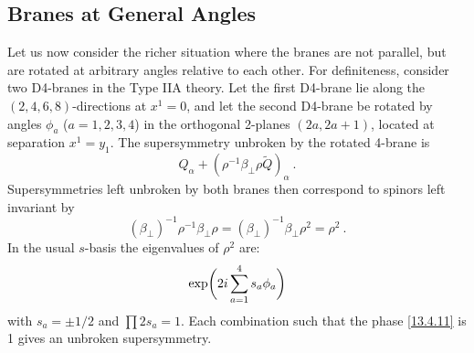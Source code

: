 \subsection*{Branes at General Angles}

Let us now consider the richer situation where the branes are not parallel, but are rotated at arbitrary angles relative to each other. For definiteness, consider two D4-branes in the Type IIA theory. Let the first D4-brane lie along the $(2,4,6,8)$-directions at $x^1 = 0$, and let the second D4-brane be rotated by angles $\phi_a$ ($a=1,2,3,4$) in the orthogonal 2-planes $(2a, 2a+1)$, located at separation $x^1 = y_1$. The supersymmetry unbroken by the rotated 4-brane is
\begin{equation}
	Q_\alpha + (\rho^{-1}\beta_\perp\rho\tilde{Q})_\alpha \:. \label{13.4.9}
\end{equation}
Supersymmetries left unbroken by both branes then correspond to spinors left invariant by
\begin{equation}
	(\beta_\perp)^{-1}\rho^{-1}\beta_\perp\rho = (\beta_\perp)^{-1}\beta_\perp\rho^2 = \rho^2 \:. \label{13.4.10}
\end{equation}
In the usual $s$-basis the eigenvalues of $\rho^2$ are:
\begin{equation}
	\exp\biggl(2i\sum_{a=1}^4 s_a\phi_a\biggr) \label{13.4.11}
\end{equation}
with $s_a = \pm 1/2$ and $\prod 2 s_a = 1$. Each combination such that the phase \eqref{13.4.11} is 1 gives an unbroken supersymmetry.


